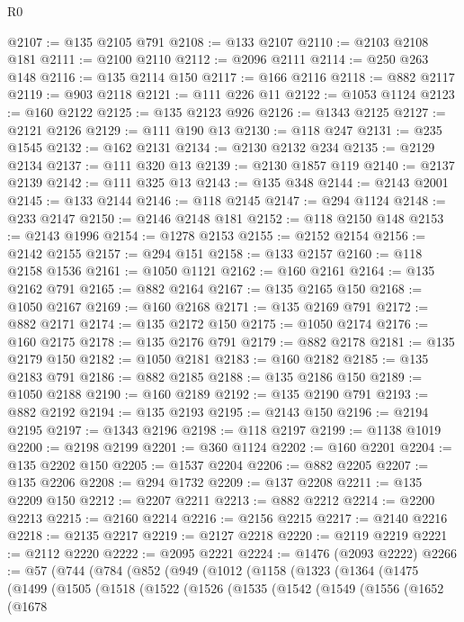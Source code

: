 \begin{lexlean}{R0}
\begin{coremodule}
@2107 := @135 @2105 @791
@2108 := @133 @2107
@2110 := @2103 @2108 @181
@2111 := @2100 @2110
@2112 := @2096 @2111
@2114 := @250 @263 @148
@2116 := @135 @2114 @150
@2117 := @166 @2116
@2118 := @882 @2117
@2119 := @903 @2118
@2121 := @111 @226 @11
@2122 := @1053 @1124
@2123 := @160 @2122
@2125 := @135 @2123 @926
@2126 := @1343 @2125
@2127 := @2121 @2126
@2129 := @111 @190 @13
@2130 := @118 @247
@2131 := @235 @1545
@2132 := @162 @2131
@2134 := @2130 @2132 @234
@2135 := @2129 @2134
@2137 := @111 @320 @13
@2139 := @2130 @1857 @119
@2140 := @2137 @2139
@2142 := @111 @325 @13
@2143 := @135 @348
@2144 := @2143 @2001
@2145 := @133 @2144
@2146 := @118 @2145
@2147 := @294 @1124
@2148 := @233 @2147
@2150 := @2146 @2148 @181
@2152 := @118 @2150 @148
@2153 := @2143 @1996
@2154 := @1278 @2153
@2155 := @2152 @2154
@2156 := @2142 @2155
@2157 := @294 @151
@2158 := @133 @2157
@2160 := @118 @2158 @1536
@2161 := @1050 @1121
@2162 := @160 @2161
@2164 := @135 @2162 @791
@2165 := @882 @2164
@2167 := @135 @2165 @150
@2168 := @1050 @2167
@2169 := @160 @2168
@2171 := @135 @2169 @791
@2172 := @882 @2171
@2174 := @135 @2172 @150
@2175 := @1050 @2174
@2176 := @160 @2175
@2178 := @135 @2176 @791
@2179 := @882 @2178
@2181 := @135 @2179 @150
@2182 := @1050 @2181
@2183 := @160 @2182
@2185 := @135 @2183 @791
@2186 := @882 @2185
@2188 := @135 @2186 @150
@2189 := @1050 @2188
@2190 := @160 @2189
@2192 := @135 @2190 @791
@2193 := @882 @2192
@2194 := @135 @2193
@2195 := @2143 @150
@2196 := @2194 @2195
@2197 := @1343 @2196
@2198 := @118 @2197
@2199 := @1138 @1019
@2200 := @2198 @2199
@2201 := @360 @1124
@2202 := @160 @2201
@2204 := @135 @2202 @150
@2205 := @1537 @2204
@2206 := @882 @2205
@2207 := @135 @2206
@2208 := @294 @1732
@2209 := @137 @2208
@2211 := @135 @2209 @150
@2212 := @2207 @2211
@2213 := @882 @2212
@2214 := @2200 @2213
@2215 := @2160 @2214
@2216 := @2156 @2215
@2217 := @2140 @2216
@2218 := @2135 @2217
@2219 := @2127 @2218
@2220 := @2119 @2219
@2221 := @2112 @2220
@2222 := @2095 @2221
@2224 := @1476 (@2093 @2222)
@2266 := @57
    (@744
      (@784
        (@852
          (@949
            (@1012
              (@1158
                (@1323
                  (@1364
                    (@1475
                      (@1499
                        (@1505
                          (@1518
                            (@1522
                              (@1526
                                (@1535
                                  (@1542
                                    (@1549
                                      (@1556
                                        (@1652
                                          (@1678

\end{coremodule}
\end{lexlean}
